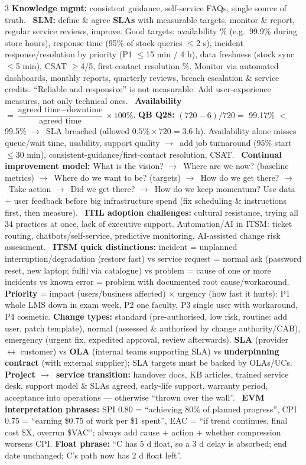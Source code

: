 \documentclass[a4paper,landscape]{article}
\newcommand{\concept}[1]{\textbf{#1}}
\newcommand{\lbl}[1]{\textbf{#1}}
\newcommand{\kh}[1]{{\setlength{\fboxsep}{0.5pt}\colorbox{keyhlcolor}{#1}}}
\newcommand{\ra}{$\rightarrow$}
\begin{document}
\begin{multicols}{3}
\concept{Knowledge mgmt:} consistent guidance, self-service FAQs, single source of truth. \textbullet\ \concept{SLM:} define \& agree \lbl{SLAs} with measurable targets, monitor \& report, regular service reviews, improve. Good targets: \kh{availability \%} (e.g.\ 99.9\% during store hours), \kh{response time} (95\% of stock queries $\le$2 s), \kh{incident response/resolution by priority} (P1 $\le$15 min / 4 h), \kh{data freshness} (stock sync $\le$5 min), \kh{CSAT $\ge$4/5}, first-contact resolution \%. Monitor via automated dashboards, monthly reports, quarterly reviews, breach escalation \& service credits. ``Reliable and responsive'' is not measurable. Add user-experience measures, not only technical ones. \textbullet\ \concept{Availability} $=\dfrac{\text{agreed time}-\text{downtime}}{\text{agreed time}}\times100\%$. \lbl{QB Q28:} $(720-6)/720=$ \kh{99.17\% $<$ 99.5\%} \ra\ SLA breached (allowed $0.5\%\times720=3.6$ h). Availability alone misses queue/wait time, usability, support quality \ra\ add job turnaround (95\% start $\le$30 min), consistent-guidance/first-contact resolution, CSAT. \textbullet\ \concept{Continual improvement model:} What is the vision? \ra\ Where are we now? (baseline metrics) \ra\ Where do we want to be? (targets) \ra\ How do we get there? \ra\ Take action \ra\ Did we get there? \ra\ How do we keep momentum? Use data + user feedback before big infrastructure spend (fix scheduling \& instructions first, then measure). \textbullet\ \concept{ITIL adoption challenges:} cultural resistance, trying all 34 practices at once, lack of executive support. Automation/AI in ITSM: ticket routing, chatbots/self-service, predictive monitoring, AI-assisted change risk assessment. \textbullet\ \lbl{ITSM quick distinctions:} \kh{incident} = unplanned interruption/degradation (restore fast) vs \kh{service request} = normal ask (password reset, new laptop; fulfil via catalogue) vs \kh{problem} = cause of one or more incidents vs \kh{known error} = problem with documented root cause/workaround. \lbl{Priority} = impact (users/business affected) $\times$ urgency (how fast it hurts): P1 whole LMS down in exam week, P2 one faculty, P3 single user with workaround, P4 cosmetic. \lbl{Change types:} \kh{standard} (pre-authorised, low risk, routine: add user, patch template), \kh{normal} (assessed \& authorised by change authority/CAB), \kh{emergency} (urgent fix, expedited approval, review afterwards). \lbl{SLA} (provider \ensuremath{\leftrightarrow} customer) vs \lbl{OLA} (internal teams supporting SLA) vs \lbl{underpinning contract} (with external supplier); SLA targets must be backed by OLAs/UCs. \lbl{Project \ra\ service transition:} handover docs, KB articles, trained service desk, support model \& SLAs agreed, early-life support, warranty period, acceptance into operations --- otherwise ``thrown over the wall''. \textbullet\ \lbl{EVM interpretation phrases:} SPI 0.80 = ``achieving 80\% of planned progress'', CPI 0.75 = ``earning \$0.75 of work per \$1 spent'', EAC = ``if trend continues, final cost \$X, overrun \$VAC''; always add cause + action + whether compression worsens CPI. \lbl{Float phrase:} ``C has 5 d float, so a 3 d delay is absorbed; end date unchanged; C's path now has 2 d float left''.\par


\end{multicols}
\end{document}
